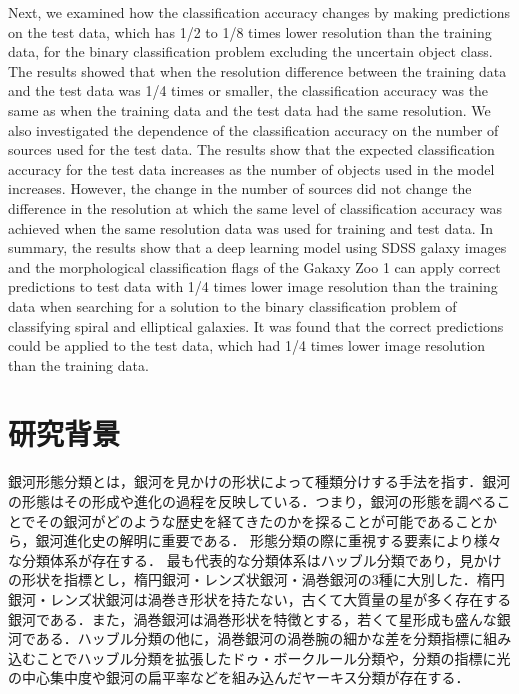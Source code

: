 \documentclass[a4j, 11pt]{jreport}
\begin{document}
Next, we examined how the classification accuracy changes by making predictions on the test data, which has 1/2 to 1/8 times lower resolution than the training data, for the binary classification problem excluding the uncertain object class. The results showed that when the resolution difference between the training data and the test data was 1/4 times or smaller, the classification accuracy was the same as when the training data and the test data had the same resolution.
We also investigated the dependence of the classification accuracy on the number of sources used for the test data. The results show that the expected classification accuracy for the test data increases as the number of objects used in the model increases. However, the change in the number of sources did not change the difference in the resolution at which the same level of classification accuracy was achieved when the same resolution data was used for training and test data. In summary, the results show that a deep learning model using SDSS galaxy images and the morphological classification flags of the Gakaxy Zoo 1 can apply correct predictions to test data with 1/4 times lower image resolution than the training data when searching for a solution to the binary classification problem of classifying spiral and elliptical galaxies. It was found that the correct predictions could be applied to the test data, which had 1/4 times lower image resolution than the training data.


\newpage
\tableofcontents       %
\thispagestyle{empty}  %
\pagebreak
{} %


\chapter{研究背景}
銀河形態分類とは，銀河を見かけの形状によって種類分けする手法を指す．銀河の形態はその形成や進化の過程を反映している．つまり，銀河の形態を調べることでその銀河がどのような歴史を経てきたのかを探ることが可能であることから，銀河進化史の解明に重要である．
形態分類の際に重視する要素により様々な分類体系が存在する．
最も代表的な分類体系はハッブル分類\cite{hubble1936}であり，見かけの形状を指標とし，楕円銀河・レンズ状銀河・渦巻銀河の3種に大別した．楕円銀河・レンズ状銀河は渦巻き形状を持たない，古くて大質量の星が多く存在する銀河である．また，渦巻銀河は渦巻形状を特徴とする，若くて星形成も盛んな銀河である．ハッブル分類の他に，渦巻銀河の渦巻腕の細かな差を分類指標に組み込むことでハッブル分類を拡張したドゥ・ボークルール分類や，分類の指標に光の中心集中度や銀河の扁平率などを組み込んだヤーキス分類が存在する．
\end{document}
